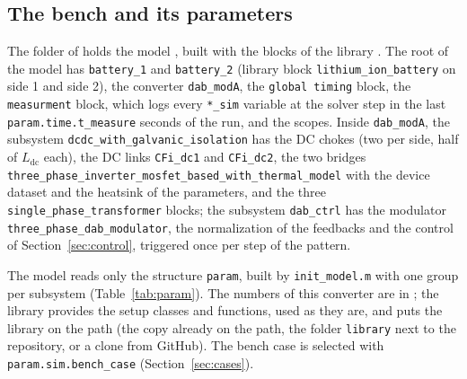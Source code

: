 \documentclass[12pt,a4paper]{scrartcl}
\newcommand{\ped}[1]{_{\mathrm{#1}}}
\newcommand{\code}[1]{\texttt{#1}}
\begin{document}
\begin{onehalfspace}
\subsection{The bench and its parameters}
\label{sec:bench}

The folder  of \cite{dcdc_repo} holds the model , built with the blocks of the library \cite{library_repo}. The root of the model has \code{battery\_1} and \code{battery\_2} (library block \code{lithium\_ion\_battery} on side 1 and side 2), the converter \code{dab\_modA}, the \code{global timing} block, the \code{measurment} block, which logs every \code{*\_sim} variable at the solver step in the last \code{param.time.t\_measure} seconds of the run, and the scopes. Inside \code{dab\_modA}, the subsystem \code{dcdc\_with\_galvanic\_isolation} has the DC chokes (two per side, half of $L\ped{dc}$ each), the DC links \code{CFi\_dc1} and \code{CFi\_dc2}, the two bridges \code{three\_phase\_inverter\_mosfet\_based\_with\_thermal\_model} with the device dataset and the heatsink of the parameters, and the three \code{single\_phase\_transformer} blocks; the subsystem \code{dab\_ctrl} has the modulator \code{three\_phase\_dab\_modulator}, the normalization of the feedbacks and the control of Section~\ref{sec:control}, triggered once per step of the pattern.

The model reads only the structure \code{param}, built by \code{init\_model.m} with one group per subsystem (Table~\ref{tab:param}). The numbers of this converter are in ; the library provides the setup classes and functions, used as they are, and  puts the library on the path (the copy already on the path, the folder \code{library} next to the repository, or a clone from GitHub). The bench case is selected with \code{param.sim.bench\_case} (Section~\ref{sec:cases}).


\end{onehalfspace}
\end{document}
